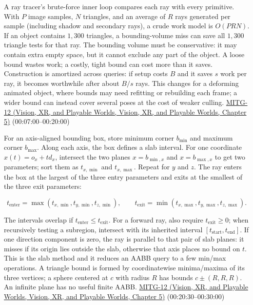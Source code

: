 A ray tracer's brute-force inner loop compares each ray with every primitive. With \(P\) image samples, \(N\) triangles, and an average of \(R\) rays generated per sample (including shadow and secondary rays), a crude work model is \(O(PRN)\). If an object contains \(1{,}300\) triangles, a bounding-volume miss can save all \(1{,}300\) triangle tests for that ray. The bounding volume must be conservative: it may contain extra empty space, but it cannot exclude any part of the object. A loose bound wastes work; a costly, tight bound can cost more than it saves. Construction is amortized across queries: if setup costs \(B\) and it saves \(s\) work per ray, it becomes worthwhile after about \(B/s\) rays. This changes for a deforming animated object, where bounds may need refitting or rebuilding each frame; a wider bound can instead cover several poses at the cost of weaker culling. \href{../07-Vision-XR-and-Playable-Worlds/main.pdf\#nameddest=04-visual-computing-ii-ch036-mitg-12---ray-tracing-ii}{MITG-12 (Vision, XR, and Playable Worlds, Vision, XR, and Playable Worlds, Chapter 5)} (00:07:00--00:20:00)

For an axis-aligned bounding box, store minimum corner \(b_{\min}\) and maximum corner \(b_{\max}\). Along each axis, the box defines a slab interval. For one coordinate \(x(t)=o_x+td_x\), intersect the two planes \(x=b_{\min,x}\) and \(x=b_{\max,x}\) to get two parameters; sort them as \(t_{x,\min}\) and \(t_{x,\max}\). Repeat for \(y\) and \(z\). The ray enters the box at the largest of the three entry parameters and exits at the smallest of the three exit parameters:

\[
t_{\mathrm{enter}}=\max(t_{x,\min},t_{y,\min},t_{z,\min}),\qquad
t_{\mathrm{exit}}=\min(t_{x,\max},t_{y,\max},t_{z,\max}).
\]

The intervals overlap if \(t_{\mathrm{enter}}\leq t_{\mathrm{exit}}\). For a forward ray, also require \(t_{\mathrm{exit}}\geq0\); when recursively testing a subregion, intersect with its inherited interval \([t_{\mathrm{start}},t_{\mathrm{end}}]\). If one direction component is zero, the ray is parallel to that pair of slab planes: it misses if its origin lies outside the slab, otherwise that axis places no bound on \(t\). This is the slab method and it reduces an AABB query to a few min/max operations. A triangle bound is formed by coordinatewise minima/maxima of its three vertices; a sphere centered at \(c\) with radius \(R\) has bounds \(c\pm(R,R,R)\). An infinite plane has no useful finite AABB. \href{../07-Vision-XR-and-Playable-Worlds/main.pdf\#nameddest=04-visual-computing-ii-ch036-mitg-12---ray-tracing-ii}{MITG-12 (Vision, XR, and Playable Worlds, Vision, XR, and Playable Worlds, Chapter 5)} (00:20:30--00:30:00)

